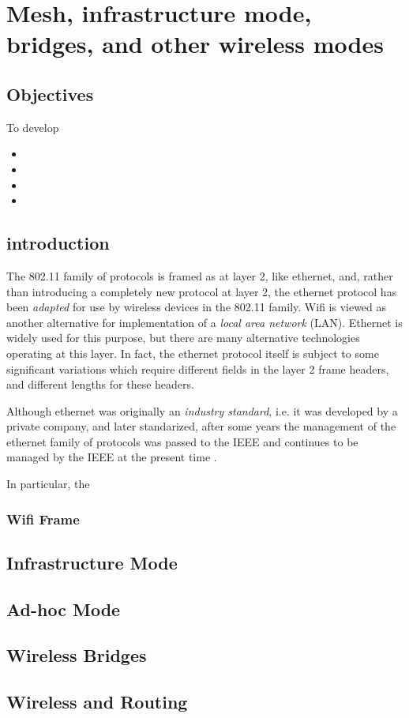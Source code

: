 \chapter{Mesh, infrastructure mode, bridges, and other wireless modes}\label{modes}

\minitoc 

\clearpage
\section*{Objectives}
To develop 
\begin{itemize}

\item 

\item 

\item 

\item 

\end{itemize}

\section{introduction}

The 802.11 family of protocols is framed as at layer 2, like ethernet, and, rather than introducing a 
completely new protocol at layer 2, the ethernet protocol has been {\em adapted} for use by
wireless devices in the 802.11 family. Wifi is viewed as another alternative for implementation of
a {\em local area network} (LAN). Ethernet is widely used for this purpose, but there are many
alternative technologies operating at this layer. In fact, the ethernet protocol itself is
subject to some significant variations which require different fields in the layer 2 frame headers,
and different lengths for these headers.

Although ethernet was originally an {\em industry standard}, i.e. it was developed by a private
company, and later standarized, after some years the management of the ethernet family of protocols
was passed to the IEEE and continues to be managed by the IEEE at the present time \cite{802.3wiki,802.3web}.

In particular, the 

\subsection{Wifi Frame}

\section{Infrastructure Mode}

\section{Ad-hoc Mode}

\section{Wireless Bridges}

\section{Wireless and Routing}
